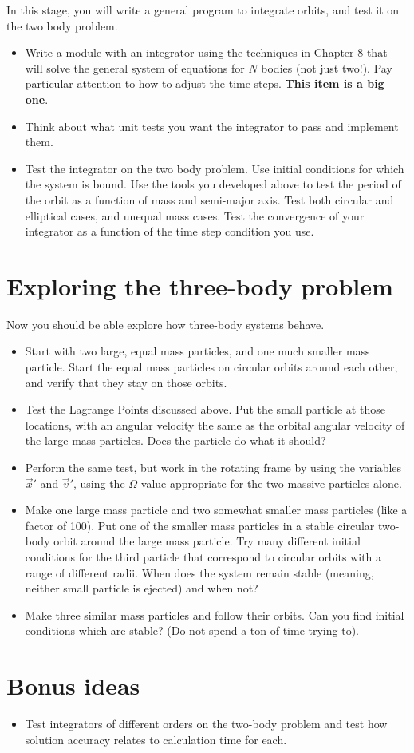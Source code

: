 \documentclass[11pt, preprint]{aastex}
\begin{document}
In this stage, you will write a general program to integrate orbits,
and test it on the two body problem.
  
\begin{itemize}
\item Write a module with an integrator using the techniques in
  Chapter 8 that will solve the general system of equations for $N$
  bodies (not just two!). Pay particular attention to how to adjust
  the time steps. {\bf This item is a big one}.
\item Think about what unit tests you want the integrator to pass and
  implement them.
\item Test the integrator on the two body problem. Use initial
  conditions for which the system is bound. Use the tools you
  developed above to test the period of the orbit as a function of
  mass and semi-major axis. Test both circular and elliptical cases,
  and unequal mass cases. Test the convergence of your integrator as a
  function of the time step condition you use.
\end{itemize}

\section{Exploring the three-body problem}

Now you should be able explore how three-body systems behave. 

\begin{itemize}
\item Start with two large, equal mass particles, and one much smaller
  mass particle. Start the equal mass particles on circular orbits
  around each other, and verify that they stay on those orbits.
\item Test the Lagrange Points discussed above.  Put the small
  particle at those locations, with an angular velocity the same as
  the orbital angular velocity of the large mass particles. Does the
  particle do what it should?
\item Perform the same test, but work in the rotating frame by using
  the variables $\vec{x}'$ and $\vec{v}'$, using the $\Omega$ value
  appropriate for the two massive particles alone. 
\item Make one large mass particle and two somewhat smaller mass
  particles (like a factor of 100). Put one of the smaller mass
  particles in a stable circular two-body orbit around the large mass
  particle. Try many different initial conditions for the third
  particle that correspond to circular orbits with a range of
  different radii. When does the system remain stable (meaning,
  neither small particle is ejected) and when not?
\item Make three similar mass particles and follow their orbits. Can
  you find initial conditions which are stable? (Do not spend a ton of
  time trying to).
\end{itemize}

\section{Bonus ideas}

\begin{itemize}
\item Test integrators of different orders on the two-body problem and
  test how solution accuracy relates to calculation time for each.
\end{itemize}
\end{document}
